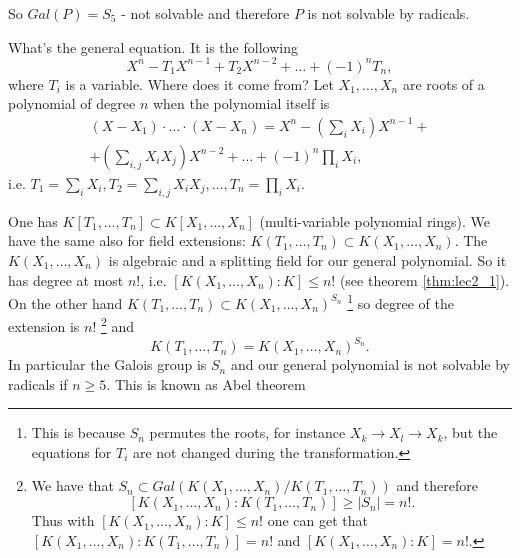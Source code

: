 \begin{example}
  So $Gal\left(P\right) = S_5$ - not solvable and therefore $P$ is not
  solvable by radicals.
  \label{ex:lec8_notsolvable1}
\end{example}

\begin{example}
  What's the general equation. It is the following
  \[
  X^n - T_1 X^{n-1} + T_2 X^{n-2} + \dots + \left(-1\right)^n T_n,
  \]
  where $T_i$ is a variable. Where does it come from? Let
  $X_1, \dots, X_n$ are roots of a polynomial of degree $n$ when the
  polynomial itself is
  \begin{eqnarray}
  \left(X - X_1\right) \cdot \dots \cdot \left(X - X_n\right) =
  X^n - \left(\sum_i X_i \right) X^{n-1} +
  \nonumber \\
  +
  \left(\sum_{i,j} X_i X_j \right) X^{n-2} + \dots +
  \left(-1\right)^n \prod_i X_i,
  \nonumber
  \end{eqnarray}
  i.e.
  $T_1 = \sum_i X_i, T_2 = \sum_{i,j} X_i X_j, \dots, T_n = \prod_i
  X_i$.

  One has $K\left[T_1, \dots, T_n\right] \subset K\left[X_1, \dots,
    X_n\right]$ (multi-variable polynomial rings). We have the same
  also for field extensions:
  $K\left(T_1, \dots, T_n\right) \subset K\left(X_1, \dots,
  X_n\right)$.
  The $K\left(X_1, \dots, X_n\right)$ is algebraic and a
  splitting field for our general polynomial. So it has degree at most
  $n!$, i.e.
  $\left[K\left(X_1, \dots, X_n\right):K\right] \le n!$
  (see theorem \ref{thm:lec2_1}). On the other hand
  $K\left(T_1, \dots, T_n\right) \subset K\left(X_1, \dots,
  X_n\right)^{S_n}$
  \footnote{
    This is because $S_n$ permutes the roots, for instance $X_k \to X_l \to
    X_k$, but the equations for $T_i$ are not changed during the
    transformation. 
  }
  so degree of the extension is $n!$
  \footnote{
    We have that
    $S_n \subset Gal\left(K\left(X_1, \dots, X_n\right)/
    K\left(T_1, \dots, T_n\right)\right)$ and therefore
    \[
    \left[K\left(X_1, \dots, X_n\right):
      K\left(T_1, \dots, T_n\right)\right] \ge \left|S_n\right| = n!.
    \]
    Thus with $\left[K\left(X_1, \dots, X_n\right):K\right] \le n!$
    one can get that
    $\left[K\left(X_1, \dots, X_n\right):
      K\left(T_1, \dots, T_n\right)\right] = n!$
    and
    $\left[K\left(X_1, \dots, X_n\right):K\right] = n!$.
  }
  and
  \[
  K\left(T_1, \dots, T_n\right) = K\left(X_1, \dots,
  X_n\right)^{S_n}.
  \]
  In particular the Galois group is $S_n$ and our
  general polynomial is not solvable by radicals if $n \ge 5$.
  This is known as Abel theorem
  \label{ex:lec8_generalequation}
\end{example}


